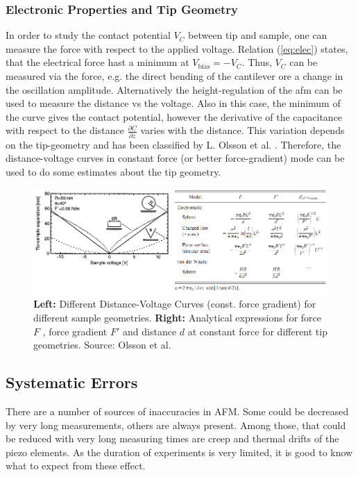 \documentclass[a4paper]{scrartcl}
\numberwithin{equation}{section}
\numberwithin{figure}{section}
\numberwithin{table}{section}
\newcommand{\Formel}[1]{(\ref{#1})}
\begin{document}
\subsubsection*{Electronic Properties and Tip Geometry}
In order to study the contact potential $V_C$ between tip and sample, one can measure the force with respect to the applied voltage. Relation \Formel{eq:elec} states, that the electrical force hast a minimum at $V_\text{bias} = -V_C$. Thus, $V_C$ can be measured via the force, e.g. the direct bending of the cantilever ore a change in the oscillation amplitude. Alternatively the height-regulation of the afm can be used to measure the distance vs the voltage. Also in this case, the minimum of the curve gives the contact potential, however the derivative of the capacitance with respect to the distance $\frac{\partial C}{\partial z}$ varies with the distance. This variation depends on the tip-geometry and has been classified by L. Olsson et al. \cite{olsson}. Therefore, the distance-voltage curves in constant force (or better force-gradient) mode can be used to do some estimates about the tip geometry.

\begin{figure} 
 \centering
       \includegraphics[width=\linewidth]{img/tip.png}
\caption{
\small \textbf{Left:} Different Distance-Voltage Curves (const. force gradient) for different sample geometries. \textbf{Right:} Analytical expressions for force $F$ , force gradient $F'$ and distance $d$ at constant force for different tip geometries. Source: Olsson et al. \cite{olsson} } 
	\label{fig:geometry}
\end{figure}

\subsection{Systematic Errors}
There are a number of sources of inaccuracies in AFM. Some could be decreased by very long measurements, others are always present. Among those, that could be reduced with very long measuring times are creep and thermal drifts of the piezo elements. As the duration of experiments is very limited, it is good to know what to expect from these effect.
\end{document}
